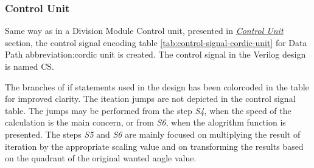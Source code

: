 \documentclass[a4paper, twoside, 11pt]{article}
\begin{document}
        \subsubsection{Control Unit}
        Same way as in a Division Module Control unit, presented in \hyperref[subsubsec:division-control-unit]{\textit{Control Unit}} section, the control signal encoding table \ref{tab:control-signal-cordic-unit} for Data Path \gls{abbreviation:cordic} unit is created. The control signal in the Verilog design is named CS.\par
        The branches of if statements used in the design has been colorcoded in the table for improved clarity. The iteation jumps are not depicted in the control signal table. The jumps may be performed from the step \textit{S4}, when the speed of the calculation is the main concern, or from \textit{S6}, when the alogrithm function is presented. The steps \textit{S5} and \textit{S6} are mainly focused on multiplying the result of iteration by the appropriate scaling value and on transforming the results based on the quadrant of the original wanted angle value.
\end{document}
